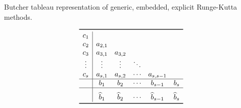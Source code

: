 \begin{table}[htpb]
    \centering
    \caption[Butcher tableau representation of generic, embedded, explicit
    Runge-Kutta methods]
    {Butcher tableau representation of generic, embedded, explicit Runge-Kutta
    methods.}
    \label{tab:genericembeddedbutcher}
    \[\renewcommand{\arraystretch}{1}
    \begin{array}{c|ccccc}
    \toprule
    c_{1} \\
    c_{2} & a_{2,1} \\
    c_{3} & a_{3,1} & a_{3,2} \\
    \vdots & \vdots & \vdots & \ddots \\
    c_{s} & a_{s,1} & a_{s,2} & \cdots & a_{s,s-1}\\
    \hline
    & b_{1} & b_{2} & \cdots & b_{s-1} & b_{s} \\
    \hline
    \rule{0pt}{16pt} & \widehat{b}_{1} & \widehat{b}_{2} & \cdots & \widehat{b}_{s-1} %
    & \widehat{b}_{s} \\
    \bottomrule
    \end{array}
\]
\end{table}
